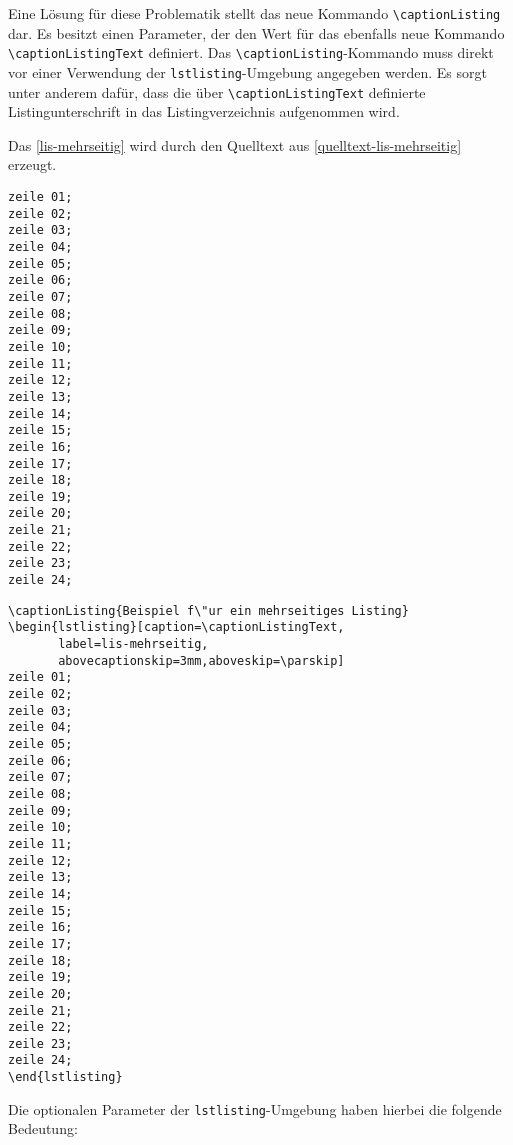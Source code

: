 Eine L\"osung f\"ur diese Problematik stellt das
neue Kommando \verb+\captionListing+ dar. Es besitzt einen Parameter, der den Wert f\"ur das ebenfalls neue Kommando \verb+\captionListingText+ 
definiert. Das \verb+\captionListing+-Kommando muss direkt vor einer Verwendung der \verb+lstlisting+-Umgebung angegeben werden. Es sorgt unter anderem 
daf\"ur, dass die \"uber \verb+\captionListingText+ definierte Listingunterschrift in das Listingverzeichnis aufgenommen wird.

Das \vref{lis-mehrseitig} wird durch den Quelltext aus \vref{quelltext-lis-mehrseitig} erzeugt.


\begin{lstlisting}[caption=\captionListingText,
       label=lis-mehrseitig,
       abovecaptionskip=3mm,aboveskip=\parskip]
zeile 01;
zeile 02;
zeile 03;
zeile 04;
zeile 05;
zeile 06;
zeile 07;
zeile 08;
zeile 09;
zeile 10;
zeile 11;
zeile 12;
zeile 13;
zeile 14;
zeile 15;
zeile 16;
zeile 17;
zeile 18;
zeile 19;
zeile 20;
zeile 21;
zeile 22;
zeile 23;
zeile 24;
\end{lstlisting}

\vspace*{\baselineskip}
\begin{programm}[htbp]
\begin{verbatim}
\captionListing{Beispiel f\"ur ein mehrseitiges Listing}
\begin{lstlisting}[caption=\captionListingText,
       label=lis-mehrseitig,
       abovecaptionskip=3mm,aboveskip=\parskip]
zeile 01;
zeile 02;
zeile 03;
zeile 04;
zeile 05;
zeile 06;
zeile 07;
zeile 08;
zeile 09;
zeile 10;
zeile 11;
zeile 12;
zeile 13;
zeile 14;
zeile 15;
zeile 16;
zeile 17;
zeile 18;
zeile 19;
zeile 20;
zeile 21;
zeile 22;
zeile 23;
zeile 24;
\end{lstlisting}
\end{verbatim}
\vspace*{-3.5mm}
\caption{Quelltext von \vref{lis-mehrseitig}\label{quelltext-lis-mehrseitig}}
\end{programm}

\clearpage
Die optionalen Parameter der \verb+lstlisting+-Umgebung haben hierbei die folgende Bedeutung:

